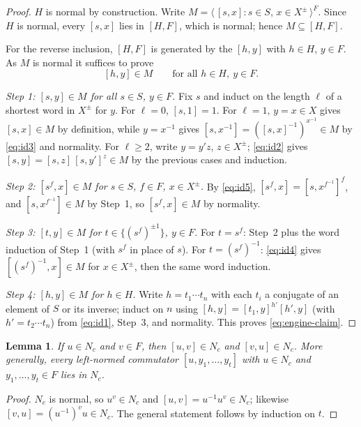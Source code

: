 \documentclass{amsart}
\newtheorem{lemma}{Lemma}
\theoremstyle{definition}
\theoremstyle{remark}
\begin{document}
\begin{proof}
$H$ is normal by construction. Write
$M=\langle\,[s,x]:s\in S,\,x\in X^{\pm}\,\rangle^{F}$. Since $H$ is normal, every
$[s,x]$ lies in $[H,F]$, which is normal; hence $M\subseteq[H,F]$.

For the reverse inclusion, $[H,F]$ is generated by the $[h,y]$ with $h\in H$,
$y\in F$. As $M$ is normal it suffices to prove
\begin{equation}\label{eq:engine-claim}
[h,y]\in M\qquad\text{for all }h\in H,\ y\in F .
\end{equation}

\emph{Step 1: $[s,y]\in M$ for all $s\in S$, $y\in F$.} Fix $s$ and induct on the
length $\ell$ of a shortest word in $X^{\pm}$ for $y$. For $\ell=0$, $[s,1]=1$. For
$\ell=1$, $y=x\in X$ gives $[s,x]\in M$ by definition, while $y=x^{-1}$ gives
$[s,x^{-1}]=([s,x]^{-1})^{x^{-1}}\in M$ by \eqref{eq:id3} and normality. For
$\ell\ge2$, write $y=y'z$, $z\in X^{\pm}$; \eqref{eq:id2} gives
$[s,y]=[s,z]\,[s,y']^{z}\in M$ by the previous cases and induction.

\emph{Step 2: $[s^{f},x]\in M$ for $s\in S$, $f\in F$, $x\in X^{\pm}$.} By
\eqref{eq:id5}, $[s^{f},x]=[s,x^{f^{-1}}]^{f}$, and $[s,x^{f^{-1}}]\in M$ by Step~1,
so $[s^{f},x]\in M$ by normality.

\emph{Step 3: $[t,y]\in M$ for $t\in\{(s^{f})^{\pm1}\}$, $y\in F$.} For $t=s^{f}$:
Step~2 plus the word induction of Step~1 (with $s^{f}$ in place of $s$). For
$t=(s^{f})^{-1}$: \eqref{eq:id4} gives $[(s^{f})^{-1},x]\in M$ for $x\in X^{\pm}$,
then the same word induction.

\emph{Step 4: $[h,y]\in M$ for $h\in H$.} Write $h=t_1\cdots t_n$ with each $t_i$ a
conjugate of an element of $S$ or its inverse; induct on $n$ using
$[h,y]=[t_1,y]^{h'}[h',y]$ (with $h'=t_2\cdots t_n$) from \eqref{eq:id1}, Step~3,
and normality. This proves \eqref{eq:engine-claim}.
\end{proof}

\begin{lemma}\label{lem:caseA}
If $u\in N_c$ and $v\in F$, then $[u,v]\in N_c$ and $[v,u]\in N_c$. More generally,
every left-normed commutator $[u,y_1,\dots,y_t]$ with $u\in N_c$ and
$y_1,\dots,y_t\in F$ lies in $N_c$.
\end{lemma}

\begin{proof}
$N_c$ is normal, so $u^{v}\in N_c$ and $[u,v]=u^{-1}u^{v}\in N_c$; likewise
$[v,u]=(u^{-1})^{v}u\in N_c$. The general statement follows by induction on $t$.
\end{proof}
\end{document}
